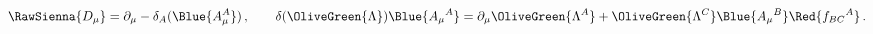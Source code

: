 \begin{equation}
 \RawSienna{D_\mu} =\partial _\mu -\delta_A(\Blue{A_\mu ^A})\,, \qquad
  \delta(\OliveGreen{\Lambda}) \Blue{A_\mu{}^A}=
\partial_\mu\OliveGreen{\Lambda^A} +\OliveGreen{\Lambda^C} \Blue{A_\mu{}^B} \Red{f_{BC}{}^A}\,.
 \label{covder}
\end{equation}

